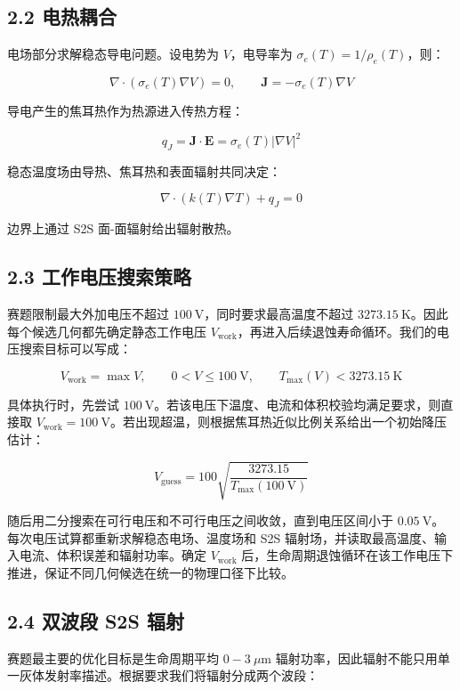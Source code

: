 \documentclass[
  a4paper,
]{ctexart}
\begin{document}
\subsection{2.2 电热耦合}\label{ux7535ux70edux8026ux5408}

电场部分求解稳态导电问题。设电势为 \(V\)，电导率为
\(\sigma_e(T)=1/\rho_e(T)\)，则：

\[
\nabla\cdot\left(\sigma_e(T)\nabla V\right)=0,\qquad \mathbf J=-\sigma_e(T)\nabla V
\]

导电产生的焦耳热作为热源进入传热方程：

\[
q_J=\mathbf J\cdot\mathbf E=\sigma_e(T)|\nabla V|^2
\]

稳态温度场由导热、焦耳热和表面辐射共同决定：

\[
\nabla\cdot(k(T)\nabla T)+q_J=0
\]

边界上通过 S2S 面-面辐射给出辐射散热。

\subsection{2.3
工作电压搜索策略}\label{ux5de5ux4f5cux7535ux538bux641cux7d22ux7b56ux7565}

赛题限制最大外加电压不超过 \(100\ \mathrm V\)，同时要求最高温度不超过
\(3273.15\ \mathrm K\)。因此每个候选几何都先确定静态工作电压
\(V_\mathrm{work}\)，再进入后续退蚀寿命循环。我们的电压搜索目标可以写成：

\[
V_\mathrm{work}=\max V,\qquad
0<V\le100\ \mathrm V,\qquad T_\mathrm{max}(V)<3273.15\ \mathrm K
\]

具体执行时，先尝试
\(100\ \mathrm V\)。若该电压下温度、电流和体积校验均满足要求，则直接取
\(V_\mathrm{work}=100\ \mathrm V\)。若出现超温，则根据焦耳热近似比例关系给出一个初始降压估计：

\[
V_\mathrm{guess}=100\sqrt{\frac{3273.15}{T_\mathrm{max}(100\ \mathrm V)}}
\]

随后用二分搜索在可行电压和不可行电压之间收敛，直到电压区间小于
\(0.05\ \mathrm V\)。每次电压试算都重新求解稳态电场、温度场和 S2S
辐射场，并读取最高温度、输入电流、体积误差和辐射功率。确定
\(V_\mathrm{work}\)
后，生命周期退蚀循环在该工作电压下推进，保证不同几何候选在统一的物理口径下比较。

\subsection{2.4 双波段 S2S
辐射}\label{ux53ccux6ce2ux6bb5-s2s-ux8f90ux5c04}

赛题最主要的优化目标是生命周期平均 \(0-3\ \mu\mathrm m\)
辐射功率，因此辐射不能只用单一灰体发射率描述。根据要求我们将辐射分成两个波段：
\end{document}
